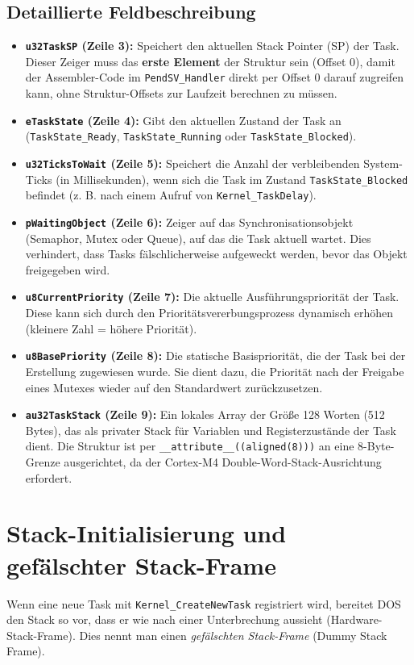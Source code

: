 \subsection{Detaillierte Feldbeschreibung}
\begin{itemize}
    \item \textbf{\lstinline|u32TaskSP| (Zeile 3):} Speichert den aktuellen Stack Pointer (SP) der Task. Dieser Zeiger muss das \textbf{erste Element} der Struktur sein (Offset 0), damit der Assembler-Code im \lstinline|PendSV_Handler| direkt per Offset 0 darauf zugreifen kann, ohne Struktur-Offsets zur Laufzeit berechnen zu müssen.
    \item \textbf{\lstinline|eTaskState| (Zeile 4):} Gibt den aktuellen Zustand der Task an (\lstinline|TaskState_Ready|, \lstinline|TaskState_Running| oder \lstinline|TaskState_Blocked|).
    \item \textbf{\lstinline|u32TicksToWait| (Zeile 5):} Speichert die Anzahl der verbleibenden System-Ticks (in Millisekunden), wenn sich die Task im Zustand \lstinline|TaskState_Blocked| befindet (z. B. nach einem Aufruf von \lstinline|Kernel_TaskDelay|).
    \item \textbf{\lstinline|pWaitingObject| (Zeile 6):} Zeiger auf das Synchronisationsobjekt (Semaphor, Mutex oder Queue), auf das die Task aktuell wartet. Dies verhindert, dass Tasks fälschlicherweise aufgeweckt werden, bevor das Objekt freigegeben wird.
    \item \textbf{\lstinline|u8CurrentPriority| (Zeile 7):} Die aktuelle Ausführungspriorität der Task. Diese kann sich durch den Prioritätsvererbungsprozess dynamisch erhöhen (kleinere Zahl = höhere Priorität).
    \item \textbf{\lstinline|u8BasePriority| (Zeile 8):} Die statische Basispriorität, die der Task bei der Erstellung zugewiesen wurde. Sie dient dazu, die Priorität nach der Freigabe eines Mutexes wieder auf den Standardwert zurückzusetzen.
    \item \textbf{\lstinline|au32TaskStack| (Zeile 9):} Ein lokales Array der Größe 128 Worten (512 Bytes), das als privater Stack für Variablen und Registerzustände der Task dient. Die Struktur ist per \lstinline|__attribute__((aligned(8)))| an eine 8-Byte-Grenze ausgerichtet, da der Cortex-M4 Double-Word-Stack-Ausrichtung erfordert.
\end{itemize}

\section{Stack-Initialisierung und gefälschter Stack-Frame}
Wenn eine neue Task mit \lstinline|Kernel_CreateNewTask| registriert wird, bereitet DOS den Stack so vor, dass er wie nach einer Unterbrechung aussieht (Hardware-Stack-Frame). Dies nennt man einen \textit{gefälschten Stack-Frame} (Dummy Stack Frame).

